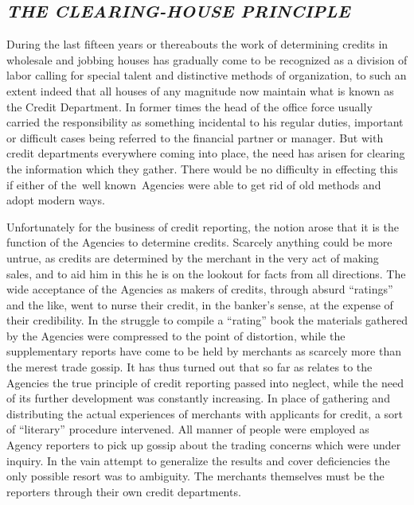 \documentclass[twoside,symmetric,nobib,justified]{tufte-book}
\begin{document}
\hypertarget{the-clearing-house-principle}{%
\subsection{\texorpdfstring{\emph{THE CLEARING-HOUSE
PRINCIPLE}}{THE CLEARING-HOUSE PRINCIPLE}}\label{the-clearing-house-principle}}

During the last fifteen years or thereabouts the work of determining
credits in wholesale and jobbing houses has gradually come to be
recognized as a division of labor calling for special talent and
distinctive methods of organization, to such an extent indeed that all
houses of any magnitude now maintain what is known as the Credit
Department. In former times the head of the office force usually carried
the responsibility as something incidental to his regular duties,
important or difficult cases being referred to the financial partner or
manager. But with credit departments everywhere coming into place, the
need has arisen for clearing the information which they gather. There
would be no difficulty in effecting this if either of the~well
known~Agencies were able to get rid of old methods and adopt modern
ways.~

Unfortunately for the business of credit reporting, the notion arose
that it is the function of the Agencies to determine credits. Scarcely
anything could be more untrue, as credits are determined by the merchant
in the very act of making sales, and to aid him in this he is on the
lookout for facts from all directions. The wide acceptance of the
Agencies as makers of credits, through absurd ``ratings'' and the like,
went to nurse their credit, in the banker's sense, at the expense of
their credibility. In the struggle to compile a ``rating'' book the
materials gathered by the Agencies were compressed to the point of
distortion, while the supplementary reports have come to be held by
merchants as scarcely more than the merest trade gossip. It has thus
turned out that so far as relates to the Agencies the true principle of
credit reporting passed into neglect, while the need of its further
development was constantly increasing. In place of gathering and
distributing the actual experiences of merchants with applicants for
credit, a sort of ``literary'' procedure intervened. All manner of
people were employed as Agency reporters to pick up gossip about the
trading concerns which were under inquiry. In the vain attempt to
generalize the results and cover deficiencies the only possible resort
was to ambiguity. The merchants themselves must be the reporters through
their own credit departments.~
\end{document}
